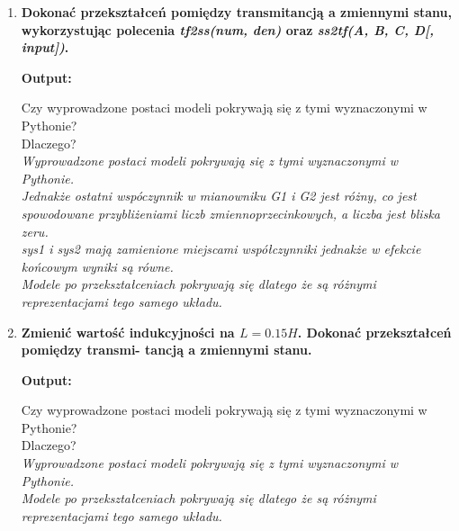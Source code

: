 \documentclass[12pt]{article}
\begin{document}
\begin{enumerate}
            \item\textbf{Dokonać przekształceń pomiędzy transmitancją a zmiennymi stanu, wykorzystując
            polecenia \emph{tf2ss(num, den)} oraz \emph{ss2tf(A, B, C, D[, input])}.}
                \begin{shbox}
                    \textbf{Output:} \\
                    
                \end{shbox}
                Czy wyprowadzone postaci modeli pokrywają się z tymi wyznaczonymi w Pythonie?\\
                Dlaczego?\\
                \emph{Wyprowadzone postaci modeli pokrywają się z tymi wyznaczonymi w Pythonie.\\
                Jednakże ostatni wspóczynnik w mianowniku \emph{G1 i G2} jest różny,
                co jest spowodowane przybliżeniami liczb zmiennoprzecinkowych, a liczba jest bliska zeru.\\
                \emph{sys1 i sys2} mają zamienione miejscami współczynniki jednakże
                w efekcie końcowym wyniki są równe.\\
                Modele po przekształceniach pokrywają się dlatego że są różnymi reprezentacjami tego samego układu.}

            \item\textbf{Zmienić wartość indukcyjności na $L = 0.15H$. Dokonać przekształceń pomiędzy transmi-
                tancją a zmiennymi stanu.}
                \begin{shbox}
                    \textbf{Output:} \\
                    
                \end{shbox}
                Czy wyprowadzone postaci modeli pokrywają się z tymi wyznaczonymi w Pythonie?\\
                Dlaczego?\\
                \emph{Wyprowadzone postaci modeli pokrywają się z tymi wyznaczonymi w Pythonie.\\
                Modele po przekształceniach pokrywają się dlatego że są różnymi reprezentacjami tego samego układu.}
        \end{enumerate}
    
\end{document}
